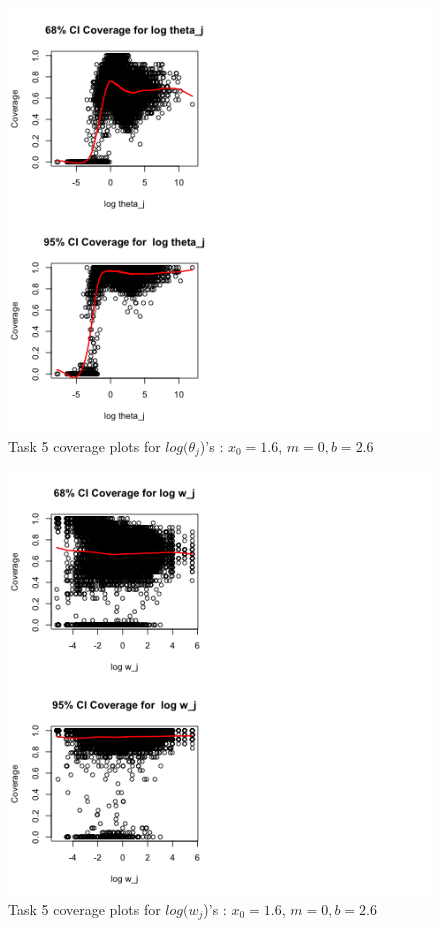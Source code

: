\documentclass[paper=a4, fontsize=11pt]{scrartcl}
\begin{document}
\begin{figure}[h!]
  \caption{Task 5 coverage plots for $log(\theta_{j}$)'s : $x_0 = 1.6$, $m = 0, b = 2.6$}
  \centering
	\includegraphics[scale=1, trim = 0 0 200 0]{keskici_wxiao_ps2_task5_plot7.png}
\end{figure}

\begin{figure}[h!]
  \caption{Task 5 coverage plots for $log(w_{j}$)'s : $x_0 = 1.6$, $m = 0, b = 2.6$}
  \centering
	\includegraphics[scale=1, trim = 0 0 200 0]{keskici_wxiao_ps2_task5_plot8.png}
\end{figure}
\end{document}

